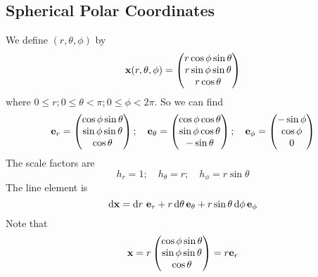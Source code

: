 \subsection{Spherical Polar Coordinates}
We define \((r, \theta, \phi)\) by
\[ \vb x(r, \theta, \phi) = \begin{pmatrix}
		r \cos \phi \sin \theta \\
		r \sin \phi \sin \theta \\
		r \cos \theta
	\end{pmatrix} \]
where \(0 \leq r; 0 \leq \theta < \pi; 0 \leq \phi < 2 \pi\). So we can find
\[ \vb e_r = \begin{pmatrix}
		\cos \phi \sin \theta \\ \sin \phi \sin \theta \\ \cos \theta
	\end{pmatrix};\quad \vb e_\theta = \begin{pmatrix}
		\cos \phi \cos \theta \\ \sin \phi \cos \theta \\ -\sin \theta
	\end{pmatrix};\quad \vb e_\phi = \begin{pmatrix}
		-\sin \phi \\ \cos \phi \\ 0
	\end{pmatrix} \]
The scale factors are
\[ h_r = 1;\quad h_\theta = r;\quad h_\phi = r \sin \theta \]
The line element is
\[ \dd \vb x = \dd{r} \, \vb e_r + r \, \dd \theta \, \vb e_\theta + r \sin \theta \, \dd \phi \, \vb e_\phi \]
Note that
\[ \vb x = r \begin{pmatrix}
		\cos \phi \sin \theta \\ \sin \phi \sin \theta \\ \cos \theta
	\end{pmatrix} = r \vb e_r \]
